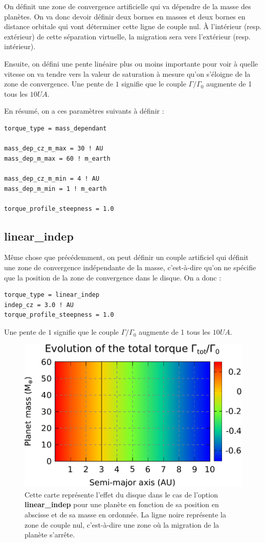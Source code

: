 On définit une zone de convergence artificielle qui va dépendre de la masse des planètes. On va donc devoir définir deux bornes en masses et deux bornes en distance orbitale qui vont déterminer cette ligne de couple nul. À l'intérieur (resp. extérieur) de cette séparation virtuelle, la migration sera vers l'extérieur (resp. intérieur).

Ensuite, on défini une pente linéaire plus ou moins importante pour voir à quelle vitesse on va tendre vers la valeur de saturation à mesure qu'on s'éloigne de la zone de convergence. Une pente de $1$ signifie que le couple $\Gamma/\Gamma_0$ augmente de 1 tous les $10\unit{UA}$.

En résumé, on a ces paramètres suivants à définir : 
\begin{verbatim}
torque_type = mass_dependant

mass_dep_cz_m_max = 30 ! AU
mass_dep_m_max = 60 ! m_earth

mass_dep_cz_m_min = 4 ! AU
mass_dep_m_min = 1 ! m_earth

torque_profile_steepness = 1.0
\end{verbatim}

\subsection{linear\_indep}\label{sec:linear_indep}
Même chose que précédemment, on peut définir un couple artificiel qui définit une zone de convergence indépendante de la masse, c'est-à-dire qu'on ne spécifie que la position de la zone de convergence dans le disque. On a donc : 
\begin{verbatim}
torque_type = linear_indep
indep_cz = 3.0 ! AU
torque_profile_steepness = 1.0
\end{verbatim}

Une pente de $1$ signifie que le couple $\Gamma/\Gamma_0$ augmente de 1 tous les $10\unit{UA}$.

\begin{figure}[htbp]
\centering
\includegraphics[width=0.65\linewidth]{figure/migration_map/linear_indep.pdf}
\caption[Carte de migration correspondant à une zone de convergence \textbf{linear\_indep}.]{Cette carte représente l'effet du
disque dans le cas de l'option \textbf{linear\_indep} pour une planète en fonction de sa position en abscisse et de sa masse en
ordonnée. La ligne noire représente la zone de couple nul, c'est-à-dire une zone où la migration de la planète s'arrête.}
\end{figure}

